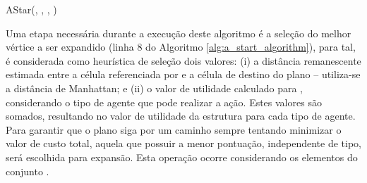 \begin{algorithm}[htpb]
  \caption[AStar]{AStar(\originstate, \targetstate, , )}
  \label{alg:a_start_algorithm}
  \begin{algorithmic}[1]

  \STATE{$\plangraph \leftarrow \emptyset$}
  \STATE{$\fringe \leftarrow \{\originstate\}$}
  \STATE{}

  \STATE{}
  \WHILE{$\fringe \neq \emptyset$}


    \STATE{}
    \ENDIF

    \STATE{}
    \STATE{}



  \ENDWHILE

  \RETURN{\FALSE}

  \end{algorithmic}
\end{algorithm}

Uma etapa necessária durante a execução deste algoritmo é a seleção do melhor vértice a ser expandido (linha 8 do Algoritmo \ref{alg:a_start_algorithm}), para tal, é considerada como heurística de seleção dois valores: (i) a distância remanescente estimada entre a célula  referenciada por  e a célula de destino do plano -- utiliza-se a distância de Manhattan; e (ii) o valor de utilidade calculado para , considerando o tipo de agente que pode realizar a ação.
Estes valores são somados, resultando no valor de utilidade da estrutura  para cada tipo de agente.
Para garantir que o plano siga por um caminho sempre tentando minimizar o valor de custo total, aquela que possuir a menor pontuação, independente de tipo, será escolhida para expansão.
Esta operação ocorre considerando os elementos do conjunto .


